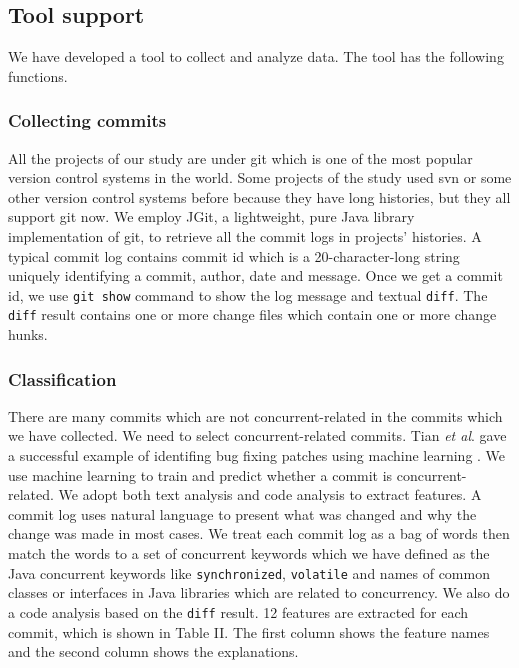 \subsection{Tool support}
\label{sec:method:tool}
We have developed a tool to collect and analyze data. The tool has the following functions.

\subsubsection{Collecting commits}
All the projects of our study are under git which is one of the most popular version control systems in the world. Some projects of the study used svn or some other version control systems before because they have long histories, but they all support git \cite{books/daglib/0022839} now. We employ JGit, a lightweight, pure Java library implementation of git, to retrieve all the commit logs in projects' histories. A typical commit log contains commit id which is a 20-character-long string uniquely identifying a commit, author, date and message. Once we get a commit id, we use \texttt{git show} command to show the log message and textual \texttt{diff}. The \texttt{diff} result contains one or more change files which contain one or more change hunks.

\subsubsection{Classification}
There are many commits which are not concurrent-related in the commits which we have collected. We need to select concurrent-related commits. Tian \textit{et al}. gave a successful example of identifing bug fixing patches using machine learning \cite{conf/icse/TianLL12}. We use machine learning to train and predict whether a commit is concurrent-related. We adopt both text analysis and code analysis to extract features. A commit log uses natural language to present what was changed and why the change was made in most cases. We treat each commit log as a bag of words then match the words to a set of concurrent keywords which we have defined as the Java concurrent keywords like \texttt{synchronized}, \texttt{volatile} and names of common classes or interfaces in Java libraries which are related to concurrency. We also do a code analysis based on the \texttt{diff} result. 12 features are extracted for each commit, which is shown in Table II. The first column shows the feature names and the second column shows the explanations.

